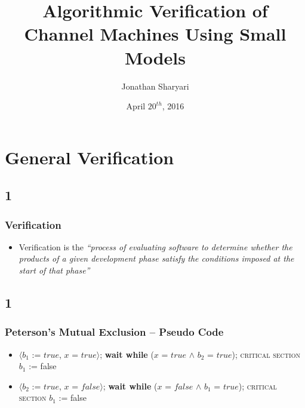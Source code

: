 \documentclass[handout]{beamer}
\title[] %
{Algorithmic Verification of Channel Machines Using Small Models}
\author[J, Sharyari | \emph{sharyari@gmail.com}] {Jonathan Sharyari}
\date[2016-04-20] %
{April $20^{th}$, 2016}
\institute[Dept. of Information Technology] %
{
  Department of Information Technology\\
  Uppsala University \\ \vspace{10pt}
  Supervisor: Parosh Abdulla \\
  Reviewer: Mohamed Faouzi Atig
}
\begin{document}
\begin{frame}[plain]
  \titlepage
\end{frame}

\begin{frame}
  \tableofcontents

\end{frame}

\section{General Verification}
\subsection*{1}
\begin{frame}
  \frametitle{Verification}
  \begin{itemize}
  \item
    Verification is the \emph{``process of evaluating software to determine whether the products of a given development phase satisfy the conditions imposed at the start of that phase''}
  \end{itemize}
\end{frame}

\subsection*{1}
\begin{frame}
  \frametitle{Peterson's Mutual Exclusion -- Pseudo Code}
  \begin{itemize}
  \item
  \begin{algorithmic}
    \small
    \State $\langle b_1$ := $true$, $x$ = $true\rangle$;
    \State \textbf{wait while} ($x$ = $true$ $\wedge$ $b_2$ = $true$);
    \State \textsc{critical section}
    \State $b_1$ := false
    \EndWhile
  \end{algorithmic}
  \item
  \begin{algorithmic}
    \small
    \State $\langle b_2$ := $true$, $x$ = $false\rangle$;
    \State \textbf{wait while} ($x$ = $false$ $\wedge$ $b_1$ = $true$);
    \State \textsc{critical section}
    \State $b_1$ := false
    \EndWhile
  \end{algorithmic}
\end{itemize}


\end{frame}
\end{document}
